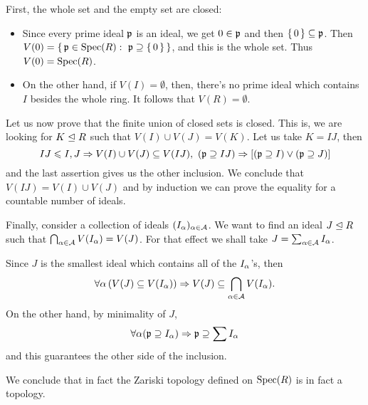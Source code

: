 \documentclass[12pt]{memoir}
\begin{document}
\begin{ptcbr}
  First, the whole set and the empty set are closed:
  \begin{itemize}
    \itemsep=-0.4em
    \item Since every prime ideal $\mathfrak{p}$ is an ideal, we get $0\in\mathfrak{p}$ and then $\{\,0\,\}\subseteq \mathfrak{p}$. Then $V(0)=\{\,\mathfrak{p}\in\operatorname{Spec}(R):\ \mathfrak{p}\supseteq \{\,0\,\}\,\}$, and this is the whole set. Thus $V(0)=\operatorname{Spec}(R)$.
    \item On the other hand, if $V(I)=\emptyset$, then, there's no prime ideal which contains $I$ besides the whole ring. It follows that $V(R)=\emptyset$.
  \end{itemize}
  Let us now prove that the finite union of closed sets is closed. This is, we are looking for $K\trianglelefteq R$ such that $V(I)\cup V(J)=V(K)$. Let us take $K=IJ$, then 
  $$IJ\leqslant I,J\Rightarrow V(I)\cup V(J)\subseteq V(IJ),\ (\mathfrak{p}\supseteq IJ)\Rightarrow[(\mathfrak{p}\supseteq I)\lor(\mathfrak{p}\supseteq J)]$$
  and the last assertion gives us the other inclusion. We conclude that $V(IJ)=V(I)\cup V(J)$ and by induction we can prove the equality for a countable number of ideals.\par 
  Finally, consider a collection of ideals $(I_\alpha)_{\alpha\in\mathcal{A}}$. We want to find an ideal $J\trianglelefteq R$ such that $\bigcap_{\alpha\in\mathcal{A}}V(I_\alpha)=V(J)$. For that effect we shall take $J=\sum_{\alpha\in\mathcal{A}}I_\alpha$.\par
  Since $J$ is the smallest ideal which contains all of the $I_\alpha$'s, then 
  $$\forall\alpha\left(V(J)\subseteq V(I_\alpha)\right)\Rightarrow V(J)\subseteq \bigcap_{\alpha\in\mathcal{A}}V(I_\alpha).$$
  On the other hand, by minimality of $J$, 
  $$\forall\alpha(\mathfrak{p}\supseteq I_\alpha)\Rightarrow\mathfrak{p}\supseteq \sum I_\alpha$$
  and this guarantees the other side of the inclusion.\par 
  We conclude that in fact the Zariski topology defined on $\operatorname{Spec}(R)$ is in fact a topology.
\end{ptcbr}
\end{document}

